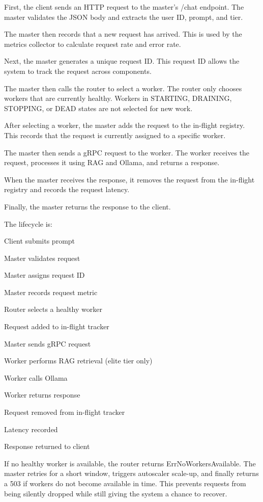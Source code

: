 First, the client sends an HTTP request to the master's /chat endpoint. The master validates the JSON body and extracts the user ID, prompt, and tier.

The master then records that a new request has arrived. This is used by the metrics collector to calculate request rate and error rate.

Next, the master generates a unique request ID. This request ID allows the system to track the request across components.

The master then calls the router to select a worker. The router only chooses workers that are currently healthy. Workers in STARTING, DRAINING, STOPPING, or DEAD states are not selected for new work.

After selecting a worker, the master adds the request to the in-flight registry. This records that the request is currently assigned to a specific worker.

The master then sends a gRPC request to the worker. The worker receives the request, processes it using RAG and Ollama, and returns a response.

When the master receives the response, it removes the request from the in-flight registry and records the request latency.

Finally, the master returns the response to the client.

The lifecycle is:
\begin{center}
Client submits prompt

Master validates request

Master assigns request ID

Master records request metric

Router selects a healthy worker

Request added to in-flight tracker

Master sends gRPC request

Worker performs RAG retrieval (elite tier only)

Worker calls Ollama

Worker returns response

Request removed from in-flight tracker

Latency recorded

Response returned to client
\end{center}

If no healthy worker is available, the router returns ErrNoWorkersAvailable. The master retries for a short window, triggers autoscaler scale-up, and finally returns a 503 if workers do not become available in time. This prevents requests from being silently dropped while still giving the system a chance to recover.


